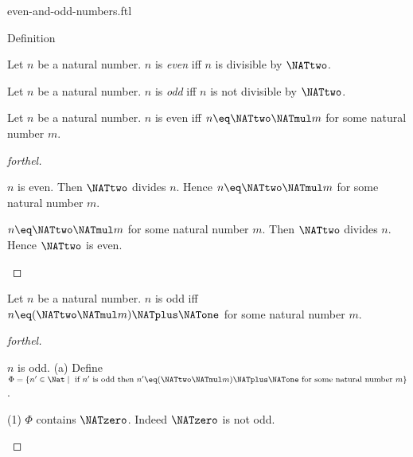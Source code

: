 \documentclass{naproche-library}
\begin{document}
\begin{smodule}[title=Even and Odd Numbers]{even-and-odd-numbers.ftl}

\begin{sfragment}{Definition}
  \begin{definition}[forthel,id=ARITHMETIC_15_4521358965847512]
    Let $n$ be a natural number.
    $n$ is \emph{even} iff $n$ is divisible by $\NATtwo$.
  \end{definition}

  \begin{definition}[forthel,id=ARITHMETIC_15_1023652125874596]
    Let $n$ be a natural number.
    $n$ is \emph{odd} iff $n$ is not divisible by $\NATtwo$.
  \end{definition}

  \begin{proposition}[forthel,id=ARITHMETIC_15_0236985458752156]
    Let $n$ be a natural number.
    $n$ is even iff $n \eq \NATtwo \NATmul m$ for some natural number $m$.
  \end{proposition}
  \begin{proof}[forthel]
    \begin{case}{$n$ is even.}
      Then $\NATtwo$ divides $n$.
      Hence $n \eq \NATtwo \NATmul m$ for some natural number $m$.
    \end{case}

    \begin{case}{$n \eq \NATtwo \NATmul m$ for some natural number $m$.}
      Then $\NATtwo$ divides $n$.
      Hence $\NATtwo$ is even.
    \end{case}
  \end{proof}

  \begin{proposition}[forthel,id=ARITHMETIC_15_1023512547854265]
    Let $n$ be a natural number.
    $n$ is odd iff $n \eq (\NATtwo \NATmul m) \NATplus \NATone$ for some natural number $m$.
  \end{proposition}
  \begin{proof}[forthel]
    \begin{case}{$n$ is odd.}
      (a) Define $\Phi = \{ n' \in \Nat \mid \text{ if }n'\text{ is odd then }n' \eq (\NATtwo \NATmul m) \NATplus \NATone\text{ for some natural number }m \}$.

      (1) $\Phi$ contains $\NATzero$.
      Indeed $\NATzero$ is not odd.


\end{case}
\end{proof}
\end{sfragment}
\end{smodule}
\end{document}
